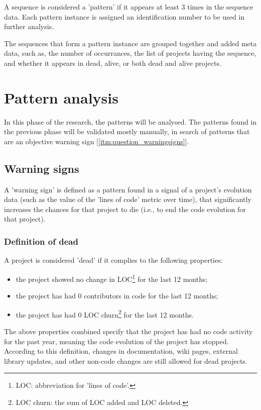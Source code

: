 A sequence is considered a 'pattern' if it appears at least 3 times in the
sequence data. Each pattern instance is assigned an identification number to be
used in further analysis.

The sequences that form a pattern instance are grouped together and added meta
data, such as, the number of occurrances, the list of projects having the
sequence, and whether it appears in dead, alive, or both dead and alive
projects.



\section{Pattern analysis}
In this phase of the research, the patterns will be analysed. The patterns found
in the previous phase will be validated mostly manually, in search of patterns
that are an objective warning sign [\ref{itm:question_warningsigns}].

\subsection{Warning signs}
A 'warning sign' is defined as a pattern found in a signal of a project's
evolution data (such as the value of the 'lines of code' metric over time), that
significantly increases the chances for that project to die (i.e., to end the
code evolution for that project).

\subsubsection{Definition of dead}
\label{def:dead}
A project is considered 'dead' if it complies to the following properties:
\begin{itemize}
	\item the project showed no change in LOC\footnote{LOC: abbreviation for
	'lines of code'.} for the last 12 months;
	\item the project has had 0 contributors in code for the last 12 months;
	\item the project has had 0 LOC churn\footnote{LOC churn: the sum of LOC added
	and LOC deleted.} for the last 12 months.
\end{itemize}

\noindent
The above properties combined specify that the project has had no code activity
for the past year, meaning the code evolution of the project has stopped.
According to this definition, changes in documentation, wiki pages, external
library updates, and other non-code changes are still allowed for dead
projects.

